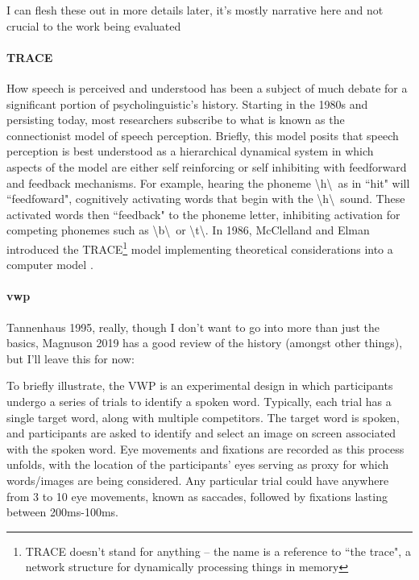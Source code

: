 \documentclass{article}
\begin{document}
I can flesh these out in more details later, it's mostly narrative here and not crucial to the work being evaluated

\paragraph{TRACE } How speech is perceived and understood has been a subject of much debate for a significant portion of psycholinguistic's history. Starting in the 1980s and persisting today, most researchers subscribe to what is known as the connectionist model of speech perception. Briefly, this model posits that speech perception is best understood as a hierarchical dynamical system in which aspects of the model are either self reinforcing or self inhibiting with feedforward and feedback mechanisms. For example, hearing the phoneme \textbackslash h\textbackslash  \ as in ``hit" will ``feedfoward", cognitively activating words that begin with the \textbackslash h\textbackslash \  sound. These activated words then ``feedback" to the phoneme letter, inhibiting activation for competing phonemes such as \textbackslash b\textbackslash \ or \textbackslash t\textbackslash. In 1986, McClelland and Elman introduced the TRACE\footnote{TRACE doesn't stand for anything -- the name is a reference to ``the trace", a network structure for dynamically processing things in memory} model implementing theoretical considerations into a computer model \cite{elman1985speech}.

\paragraph{vwp} Tannenhaus 1995, really, though I don't want to go into more than just the basics, Magnuson 2019 has a good review of the history (amongst other things), but I'll leave this for now:

To briefly illustrate, the VWP is an experimental design in which participants undergo a series of trials to identify a spoken word. Typically, each trial has a single target word, along with multiple competitors. The target word is spoken, and participants are asked to identify and select an image on screen associated with the spoken word. Eye movements and fixations are recorded as this process unfolds, with the location of the participants' eyes serving as proxy for which words/images are being considered. Any particular trial could have anywhere from 3 to 10 eye movements, known as saccades, followed by fixations lasting between 200ms-100ms. 
\end{document}
